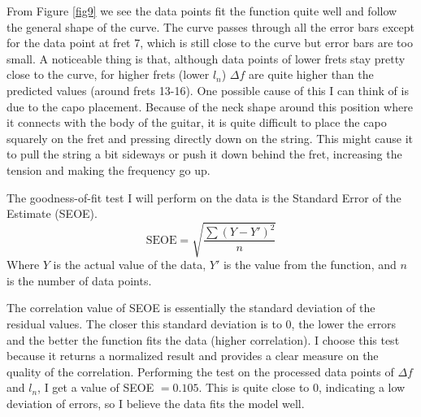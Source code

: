 From Figure \ref{fig9} we see the data points fit the function quite well and follow the general shape of the curve. The curve passes through all the error bars except for the data point at fret 7, which is still close to the curve but error bars are too small. A noticeable thing is that, although data points of lower frets stay pretty close to the curve, for higher frets (lower $l_n$) $\Delta f$ are quite higher than the predicted values (around frets 13-16). One possible cause of this I can think of is due to the capo placement. Because of the neck shape around this position where it connects with the body of the guitar, it is quite difficult to place the capo squarely on the fret and pressing directly down on the string. This might cause it to pull the string a bit sideways or push it down behind the fret, increasing the tension and making the frequency go up. \par
The goodness-of-fit test I will perform on the data is the Standard Error of the Estimate (SEOE). 
\begin{equation*}
    \text{SEOE} = \sqrt{\frac{\sum{(Y-Y')^2}}{n}}
\end{equation*}
Where $Y$ is the actual value of the data, $Y'$ is the value from the function, and $n$ is the number of data points. \cite{lane} \par
The correlation value of SEOE is essentially the standard deviation of the residual values. The closer this standard deviation is to 0, the lower the errors and the better the function fits the data (higher correlation). I choose this test because it returns a normalized result and provides a clear measure on the quality of the correlation. Performing the test on the processed data points of $\Delta f$ and $l_n$, I get a value of SEOE $= 0.105$. This is quite close to 0, indicating a low deviation of errors, so I believe the data fits the model well.